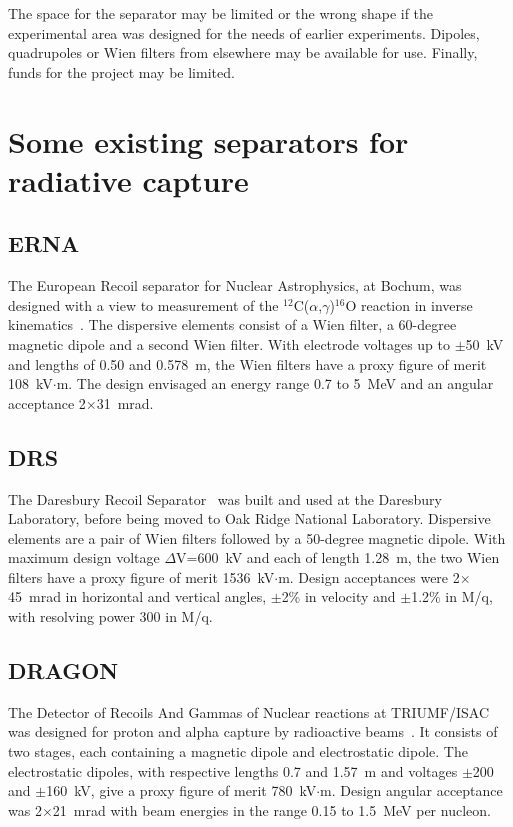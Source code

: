 \documentclass[12pt]{amsart}
\begin{document}
 The space   for the separator may be limited or the wrong shape if the experimental area was designed for the needs of earlier experiments.   Dipoles, quadrupoles  or Wien filters from elsewhere  may be available for use.  Finally,  funds for the project may be limited.   

\section{Some existing separators for radiative capture}
\subsection{ERNA}
The European Recoil separator for Nuclear Astrophysics, at Bochum, was designed with a view to measurement of the $^{12}$C($\alpha$,$\gamma$)$^{16}$O reaction in inverse 
kinematics~\cite{Ro99}.  The dispersive elements consist of a Wien filter, a 60-degree magnetic dipole and a second Wien filter.    With electrode voltages up to $\pm$50~kV and lengths of 0.50 and 0.578~m, the Wien filters have a proxy figure of merit 108~kV$\cdot$m.   The design envisaged an energy range 0.7 to 5~MeV and an angular acceptance 2$\times$31~mrad.

\subsection{DRS}
The Daresbury Recoil Separator~\cite{Ja88}  was built and used at the Daresbury Laboratory, before being moved to Oak Ridge National Laboratory.  Dispersive elements are a pair of Wien filters followed by a 50-degree magnetic dipole.   With maximum design voltage $\Delta$V=600~kV and each of length 1.28~m, the two Wien filters have a proxy figure of merit 1536~kV$\cdot$m.
Design acceptances were 2$\times$45~mrad in horizontal and vertical angles, $\pm$2\% in velocity and  $\pm$1.2\% in M/q, with resolving power 300 in M/q.
 
\subsection{DRAGON}
The Detector of Recoils And Gammas of Nuclear reactions at TRIUMF/ISAC was designed for proton and alpha capture by radioactive beams~\cite{hut03b}.  It consists of two stages, each containing a magnetic dipole and electrostatic dipole.   The electrostatic dipoles, with respective lengths 0.7 and 1.57~m and voltages $\pm$200 and $\pm$160~kV, give a proxy figure of merit 780~kV$\cdot$m.  Design angular acceptance was 2$\times$21~mrad with beam energies in the range 0.15 to 1.5~MeV per nucleon.
\end{document}
